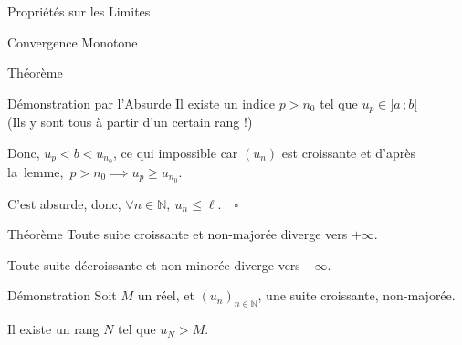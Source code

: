 \documentclass{cours}
\begin{document}
\begin{Gpartie}{Propriétés sur les Limites}
\begin{Spartie}{Convergence Monotone}
\begin{SSpartie}{Théorème}
\begin{SSSpartie}{Démonstration par l'Absurde}
                    Il existe un indice $p>n_0$ tel que $u_p\in\big]a\,; b\big[$ \\ (Ils y sont tous à partir d'un certain rang !)

                    Donc, $u_p<b<u_{n_0}$, ce qui impossible car $(u_n)$ est croissante et d'après la~lemme,~$p>n_0\implies u_p\geq u_{n_0}$.

                    C'est absurde, donc, $\forall n\in\mathbb{N},~u_n\leq\ell$.$\quad\square$
                \end{SSSpartie}
            \end{SSpartie}
            \pagebreak
            \begin{SSpartie}{Théorème} 
                Toute suite croissante et non-majorée diverge vers $+\infty$.

                Toute suite décroissante et non-minorée diverge vers $-\infty$.

                \begin{SSSpartie}{Démonstration} 
                    Soit $M$ un réel, et $(u_n)_{n\in\mathbb{N}}$, une suite croissante, non-majorée.

                    Il existe un rang $N$ tel que $u_N>M$.


\end{SSSpartie}
\end{SSpartie}
\end{Spartie}
\end{Gpartie}
\end{document}
